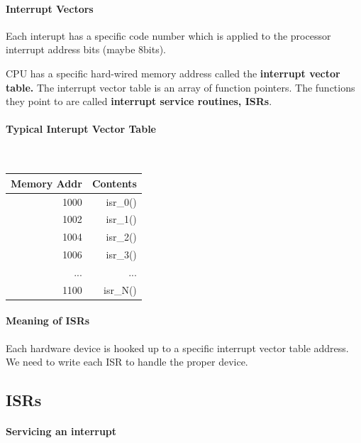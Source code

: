 \documentclass{article}	%
\begin{document}
\paragraph{Interrupt Vectors}

Each interupt has a specific code number which is applied to
the processor interrupt address bits (maybe 8bits).

CPU has a specific hard-wired memory address called the
{\bf interrupt vector table.}    The interrupt vector
table is an array of function pointers.  The functions
they point to are called
{\bf interrupt service routines, ISRs}.

\paragraph{Typical Interupt Vector Table}
{\tt
\begin{tabular}{|r|r|}
\hline
Memory Addr             &       Contents \\ \hline

1000                    &       isr\_0()  \\ \hline
1002                    &       isr\_1()  \\ \hline
1004                    &       isr\_2()  \\ \hline
1006                    &       isr\_3()  \\ \hline
...                     &       ...       \\ \hline
1100                    &       isr\_N()  \\ \hline

\end{tabular}
}

\paragraph{Meaning of ISRs}

Each hardware device is hooked up to a specific interrupt vector
table address.  We need to write each ISR to handle the proper
device.

\subsection{ISRs}

\paragraph{Servicing an interrupt}
\end{document}
